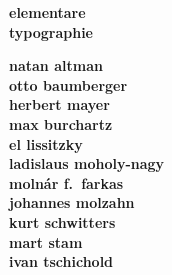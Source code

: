 \documentclass{article}
\begin{document}
  \NewCoffin \result
  \NewCoffin \aaa
  \NewCoffin \bbb
  \NewCoffin \ccc
  \NewCoffin \ddd
  \NewCoffin \eee
  \NewCoffin \fff
  \NewCoffin {}
  \NewCoffin {}
  \NewCoffin {}

\SetHorizontalCoffin \result {}
\SetHorizontalCoffin {}
\SetHorizontalCoffin {}
\SetHorizontalCoffin {}
\SetHorizontalCoffin {}
\SetVerticalCoffin \eee {180pt}
                 {\raggedleft\fontsize{31}{36}\sffamily\bfseries 
                      elementare\\
                      typographie}
\SetVerticalCoffin \fff {140pt}
                 {\raggedright \fontsize{13}{14}\sffamily\bfseries 
                       natan altman \\
                       otto baumberger \\
                       herbert mayer \\
                       max burchartz \\
                       el lissitzky \\
                       ladislaus moholy-nagy \\
                       moln\'ar f.~farkas \\
                       johannes molzahn \\
                       kurt schwitters \\
                       mart stam \\
                       ivan tschichold}
     
\RotateCoffin {}
\RotateCoffin {}

\SetHorizontalCoffin {}
\SetHorizontalCoffin {}
\SetHorizontalCoffin {}
\end{document}
